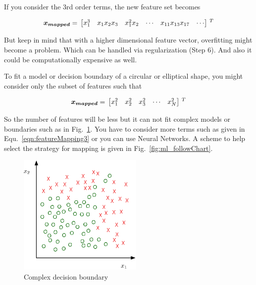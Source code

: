 If you consider the 3rd order terms, the new feature set 
becomes

\begin{equation}{\label{eqn:featureMapping4}}
\bm{x_{mapped}}
=\,
\begin{bmatrix}
x_1^3 & x_1x_2x_3 & x_1^2x_2 & \cdots  & x_{11}x_{13}x_{17} & \cdots  
\end{bmatrix}
\,^ T
\end{equation} 

But keep in mind that with a higher dimensional feature vector, 
overfitting might become a problem. Which can be handled 
via regularization (Step 6). And also it could be computationally 
expensive as well.

To fit a model or decision boundary of a circular or elliptical 
shape, you might consider only the subset of features such that

\begin{equation}{\label{eqn:featureMappin54}}
\bm{x_{mapped}}
=\,
\begin{bmatrix}
x_1^2 & x_2^2 & x_3^2 & \cdots & x_N^2  
\end{bmatrix}
\,^ T
\end{equation} 

So the number of features will be less but it can not fit complex 
models or boundaries such as in Fig.~\ref{fig:complexBoundary}. 
You have to  consider more terms such as given in 
Equ.~\ref{eqn:featureMapping3} or you can use Neural Networks.
A scheme to help select the strategy for mapping is given in  Fig.~\ref{fig:ml_followChart}. 

\begin{figure}
\begin{center}
\includegraphics[width=6cm]{figures/complexDecisionBoundary}    %
\caption{Complex decision boundary} 
\label{fig:complexBoundary}
\end{center}
\end{figure}


